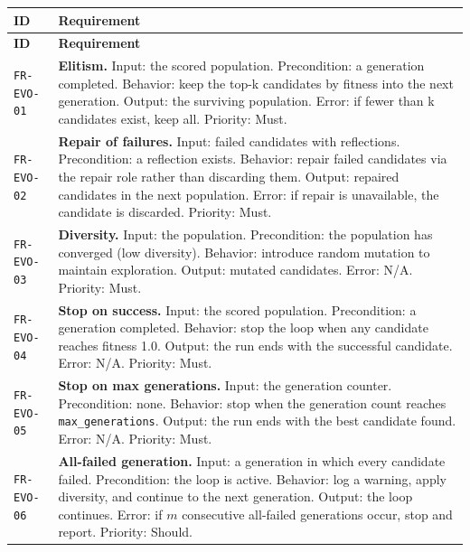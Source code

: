 \documentclass[12pt,a4paper]{article}
\begin{document}
\begin{longtable}{@{}p{2.2cm}p{10.6cm}@{}}
\toprule
\textbf{ID} & \textbf{Requirement} \\
\midrule
\endfirsthead
\toprule
\textbf{ID} & \textbf{Requirement} \\
\midrule
\endhead
\bottomrule
\endfoot

\texttt{FR-EVO-01} & \textbf{Elitism.} Input: the scored population. Precondition: a generation completed. Behavior: keep the top-k candidates by fitness into the next generation. Output: the surviving population. Error: if fewer than k candidates exist, keep all. Priority: Must. \\
\addlinespace[2pt]

\texttt{FR-EVO-02} & \textbf{Repair of failures.} Input: failed candidates with reflections. Precondition: a reflection exists. Behavior: repair failed candidates via the repair role rather than discarding them. Output: repaired candidates in the next population. Error: if repair is unavailable, the candidate is discarded. Priority: Must. \\
\addlinespace[2pt]

\texttt{FR-EVO-03} & \textbf{Diversity.} Input: the population. Precondition: the population has converged (low diversity). Behavior: introduce random mutation to maintain exploration. Output: mutated candidates. Error: N/A. Priority: Must. \\
\addlinespace[2pt]

\texttt{FR-EVO-04} & \textbf{Stop on success.} Input: the scored population. Precondition: a generation completed. Behavior: stop the loop when any candidate reaches fitness 1.0. Output: the run ends with the successful candidate. Error: N/A. Priority: Must. \\
\addlinespace[2pt]

\texttt{FR-EVO-05} & \textbf{Stop on max generations.} Input: the generation counter. Precondition: none. Behavior: stop when the generation count reaches \texttt{max\_generations}. Output: the run ends with the best candidate found. Error: N/A. Priority: Must. \\
\addlinespace[2pt]

\texttt{FR-EVO-06} & \textbf{All-failed generation.} Input: a generation in which every candidate failed. Precondition: the loop is active. Behavior: log a warning, apply diversity, and continue to the next generation. Output: the loop continues. Error: if $m$ consecutive all-failed generations occur, stop and report. Priority: Should. \\
\bottomrule
\end{longtable}
\end{document}
